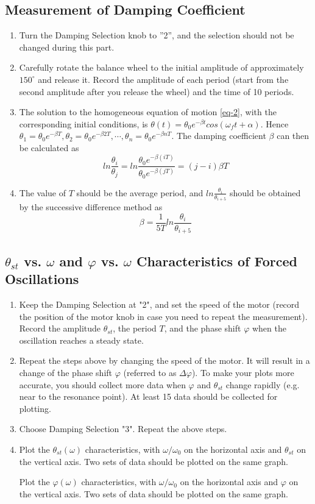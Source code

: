 \documentclass{article}
\begin{document}
\subsection{Measurement of Damping Coefficient}
\begin{enumerate}[(1)]
	\item
	Turn the Damping Selection knob to ”2”, and the selection should not be changed during this part.
	\item
	Carefully rotate the balance wheel to the initial amplitude of approximately $150^\circ$ and release it. Record the amplitude of each period (start from the second amplitude after you release the wheel) and the time of 10 periods.
	\item
	The solution to the homogeneous equation of motion \ref{eq-2}, with the corresponding initial conditions, is $ \theta(t)=\theta_0e^{-\beta t}cos(\omega_f t+\alpha) $. Hence $ \theta_1=\theta_0e^{-\beta T}, \theta_2=\theta_0e^{-\beta 2T},\cdots, \theta_n=\theta_0e^{-\beta nT} $. The damping coefficient $ \beta $ can then be calculated as
	$$
		ln\dfrac{\theta_i}{\theta_j}=ln\dfrac{\theta_0e^{-\beta(iT)}}{\theta_0e^{-\beta(jT)}}=(j-i)\beta T
	$$
	\item The value of $ T $ should be the average period, and $ ln\frac{\theta_i}{\theta_{i+5}} $ should be obtained by the successive difference method as
	$$\beta=\dfrac{1}{5T}ln\dfrac{\theta_i}{\theta_{i+5}}$$
\end{enumerate}

\subsection{$ \theta_{st} $ vs. $ \omega $ and $ \varphi $ vs. $ \omega $ Characteristics of Forced Oscillations}
\begin{enumerate}
	\item Keep the Damping Selection at "2", and set the speed of the motor (record the position of the motor knob in case you need to repeat the measurement). Record the amplitude $ \theta_{st} $, the period $ T $, and the phase shift $ \varphi $ when the oscillation reaches	a steady state.
	\item Repeat the steps above by changing the speed of the motor. It will result in a change of the phase shift $ \varphi $ (referred to as $ \Delta \varphi $). To make your plots more accurate, you should collect more data when $ \varphi $ and $ \theta_{st} $ change rapidly (e.g. near to the resonance point). At least 15 data should be collected for plotting.
	\item Choose Damping Selection "3". Repeat the above steps.
	\item Plot the $ \theta_{st}(\omega) $ characteristics, with $ \omega/\omega_0 $ on the horizontal axis and $ \theta_{st} $ on the
	vertical axis. Two sets of data should be plotted on the same graph.
	
	Plot the $ \varphi(\omega) $ characteristics, with $ \omega/\omega_0 $ on the horizontal axis and $ \varphi $ on the vertical
	axis. Two sets of data should be plotted on the same graph.
\end{enumerate}
\end{document}
